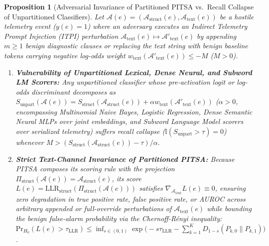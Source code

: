\documentclass[11pt,a4paper]{article}
\newtheorem{proposition}{Proposition}
\begin{document}
\begin{proposition}[Adversarial Invariance of Partitioned PITSA vs.\ Recall Collapse of Unpartitioned Classifiers]
\label{prop:partition_invariance}
Let $\mathcal{A}(e) = (\mathcal{A}_{\text{struct}}(e), \mathcal{A}_{\text{text}}(e))$ be a hostile telemetry event ($y(e) = 1$) where an adversary executes an Indirect Telemetry Prompt Injection (ITPI) perturbation $\mathcal{A}_{\text{text}}(e) \mapsto \mathcal{A}'_{\text{text}}(e)$ by appending $m \ge 1$ benign diagnostic clauses or replacing the text string with benign baseline tokens carrying negative log-odds weight $w_{\text{text}}(\mathcal{A}'_{\text{text}}(e)) \le -M$ ($M > 0$).
\begin{enumerate}
  \item \textbf{Vulnerability of Unpartitioned Lexical, Dense Neural, and Subword LM Scorers:} Any unpartitioned classifier whose pre-activation logit or log-odds discriminant decomposes as $S_{\text{unpart}}(\mathcal{A}(e)) = S_{\text{struct}}(\mathcal{A}_{\text{struct}}(e)) + \alpha w_{\text{text}}(\mathcal{A}'_{\text{text}}(e))$ ($\alpha > 0$, encompassing Multinomial Naive Bayes, Logistic Regression, Dense Semantic Neural MLPs over joint embeddings, and Subword Language Model scorers over serialized telemetry) suffers recall collapse ($\mathbb{I}(S_{\text{unpart}} > \tau) = 0$) whenever $M > (S_{\text{struct}}(\mathcal{A}_{\text{struct}}(e)) - \tau) / \alpha$.
  \item \textbf{Strict Text-Channel Invariance of Partitioned PITSA:} Because PITSA composes its scoring rule with the projection $\Pi_{\text{struct}}(\mathcal{A}(e)) = \mathcal{A}_{\text{struct}}(e)$, its score $L(e) = \text{LLR}_{\text{struct}}(\Pi_{\text{struct}}(\mathcal{A}(e)))$ satisfies $\nabla_{\mathcal{A}_{\text{text}}} L(e) \equiv 0$, ensuring zero degradation in true positive rate, false positive rate, or AUROC across arbitrary appended or full-override perturbations of $\mathcal{A}_{\text{text}}(e)$ while bounding the benign false-alarm probability via the Chernoff-R\'{e}nyi inequality: $\text{Pr}_{H_0}(L(e) > \tau_{\text{LLR}}) \le \inf_{s \in (0,1)} \exp\bigl(-s\tau_{\text{LLR}} - \sum_{k=1}^K D_{1-s}(P_{k,0} \parallel P_{k,1})\bigr)$.
\end{enumerate}
\end{proposition}
\end{document}
